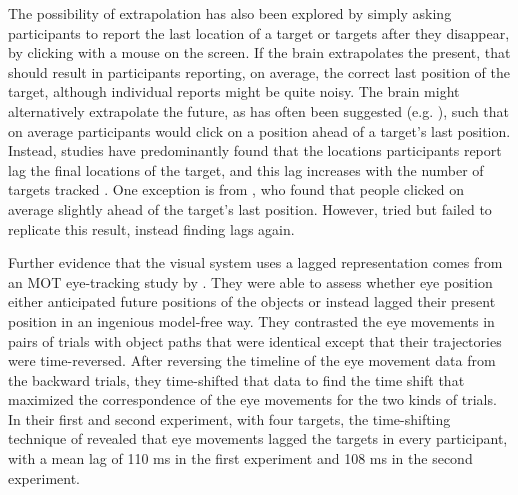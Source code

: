 \documentclass[
]{book}
\begin{document}
The possibility of extrapolation has also been explored by simply asking participants to report the last location of a target or targets after they disappear, by clicking with a mouse on the screen. If the brain extrapolates the present, that should result in participants reporting, on average, the correct last position of the target, although individual reports might be quite noisy. The brain might alternatively extrapolate the future, as has often been suggested (e.g. \citet{nijhawanVisualPredictionPsychophysics2008}), such that on average participants would click on a position ahead of a target's last position. Instead, studies have predominantly found that the locations participants report lag the final locations of the target, and this lag increases with the number of targets tracked \citep{howardTrackingChangingFeatures2008, howardPositionRepresentationsLag2011}. One exception is from \citet{iordanescuDemandbasedDynamicDistribution2009}, who found that people clicked on average slightly ahead of the target's last position. However, \citet{howardPositionRepresentationsLag2011} tried but failed to replicate this result, instead finding lags again.

Further evidence that the visual system uses a lagged representation comes from an MOT eye-tracking study by \citet{lukavskyGazePositionLagging2016}. They were able to assess whether eye position either anticipated future positions of the objects or instead lagged their present position in an ingenious model-free way. They contrasted the eye movements in pairs of trials with object paths that were identical except that their trajectories were time-reversed. After reversing the timeline of the eye movement data from the backward trials, they time-shifted that data to find the time shift that maximized the correspondence of the eye movements for the two kinds of trials. In their first and second experiment, with four targets, the time-shifting technique of \citet{lukavskyGazePositionLagging2016} revealed that eye movements lagged the targets in every participant, with a mean lag of 110 ms in the first experiment and 108 ms in the second experiment.
\end{document}
